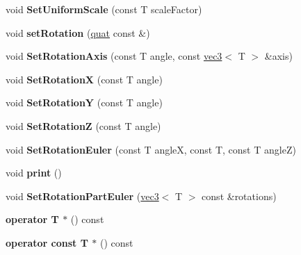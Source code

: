 \begin{DoxyCompactItemize}
\item 
\hypertarget{classmath_1_1mat33_a3c11604597c76d78840aa36a72db3ffe}{
void {\bfseries SetUniformScale} (const T scaleFactor)}
\label{classmath_1_1mat33_a3c11604597c76d78840aa36a72db3ffe}

\item 
\hypertarget{classmath_1_1mat33_afa553dc6ad37cddc30dfc5fe030211c1}{
void {\bfseries setRotation} (\hyperlink{classmath_1_1quat}{quat} const \&)}
\label{classmath_1_1mat33_afa553dc6ad37cddc30dfc5fe030211c1}

\item 
\hypertarget{classmath_1_1mat33_a8e3436cfb380ebf5a5bab4c716fd09d4}{
void {\bfseries SetRotationAxis} (const T angle, const \hyperlink{classmath_1_1vec3}{vec3}$<$ T $>$ \&axis)}
\label{classmath_1_1mat33_a8e3436cfb380ebf5a5bab4c716fd09d4}

\item 
\hypertarget{classmath_1_1mat33_ac85087803d562d566c0fd223fd4dcefc}{
void {\bfseries SetRotationX} (const T angle)}
\label{classmath_1_1mat33_ac85087803d562d566c0fd223fd4dcefc}

\item 
\hypertarget{classmath_1_1mat33_a1256da6ae3e29025fb05d1178026b2b3}{
void {\bfseries SetRotationY} (const T angle)}
\label{classmath_1_1mat33_a1256da6ae3e29025fb05d1178026b2b3}

\item 
\hypertarget{classmath_1_1mat33_a89da4d2ddbe2c09a2d7b71a6be104d52}{
void {\bfseries SetRotationZ} (const T angle)}
\label{classmath_1_1mat33_a89da4d2ddbe2c09a2d7b71a6be104d52}

\item 
\hypertarget{classmath_1_1mat33_a25340365b68fe7c9c0770e6ae1f32ddd}{
void {\bfseries SetRotationEuler} (const T angleX, const T, const T angleZ)}
\label{classmath_1_1mat33_a25340365b68fe7c9c0770e6ae1f32ddd}

\item 
\hypertarget{classmath_1_1mat33_ade4559e0eb4c2010c684a696ef505996}{
void {\bfseries print} ()}
\label{classmath_1_1mat33_ade4559e0eb4c2010c684a696ef505996}

\item 
\hypertarget{classmath_1_1mat33_a698a06538a131424dc187998d4ecdd63}{
void {\bfseries SetRotationPartEuler} (\hyperlink{classmath_1_1vec3}{vec3}$<$ T $>$ const \&rotations)}
\label{classmath_1_1mat33_a698a06538a131424dc187998d4ecdd63}

\item 
\hypertarget{classmath_1_1mat33_ad1b3ef329d70bffaae957a7e871ea29a}{
{\bfseries operator T $\ast$} () const }
\label{classmath_1_1mat33_ad1b3ef329d70bffaae957a7e871ea29a}

\item 
\hypertarget{classmath_1_1mat33_a727616b6c5fa235e4e48b61e41996fb1}{
{\bfseries operator const T $\ast$} () const }
\label{classmath_1_1mat33_a727616b6c5fa235e4e48b61e41996fb1}

\end{DoxyCompactItemize}
